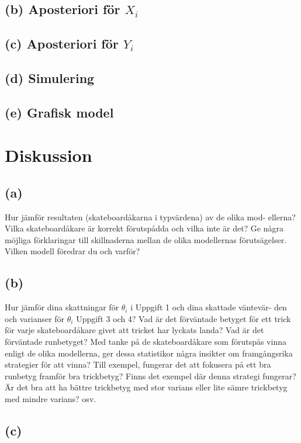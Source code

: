 \documentclass{assignment}
\begin{document}
\subsection*{(b) Aposteriori för $X_i$}

\subsection*{(c) Aposteriori för $Y_i$}
\subsection*{(d) Simulering}
\subsection*{(e) Grafisk model}
\section{Diskussion}
\subsection*{(a)} Hur jämför resultaten (skateboardåkarna i typvärdena) av de olika mod-
ellerna? Vilka skateboardåkare är korrekt förutspådda och vilka inte är det?
Ge några möjliga förklaringar till skillnaderna mellan de olika modellernas
förutsägelser. Vilken modell föredrar du och varför?

\subsection*{(b)}
Hur jämför dina skattningar för $\theta_i$ i Uppgift 1 och dina skattade väntevär-
den och varianser för $\theta_i$ Uppgift 3 och 4? Vad är det förväntade betyget
för ett trick för varje skateboardåkare givet att tricket har lyckats landa?
Vad är det förväntade runbetyget? Med tanke på de skateboardåkare som
förutspås vinna enligt de olika modellerna, ger dessa statistikor några insikter
om framgångsrika strategier för att vinna? Till exempel, fungerar det att
fokusera på ett bra runbetyg framför bra trickbetyg? Finns det exempel där
denna strategi fungerar? Är det bra att ha bättre trickbetyg med stor varians
eller lite sämre trickbetyg med mindre varians? osv.

\subsection*{(c)}
\end{document}
